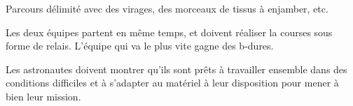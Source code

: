 \documentclass{grand-jeu}
\begin{document}
\begin{liste-materiel}
\end{liste-materiel}

\begin{regles}
Parcours délimité avec des virages, des morceaux de tissus à enjamber, etc.

Les deux équipes partent en même temps, et doivent réaliser la courses sous forme de relais. 
L’équipe qui va le plus vite gagne des b-dures.
\end{regles}

\begin{imaginaire}
Les astronautes doivent montrer qu'ils sont prêts à travailler ensemble dans des conditions difficiles et à s'adapter au matériel à leur disposition pour mener à bien leur mission. 
\end{imaginaire}

\begin{moments-stop}
\end{moments-stop}
\end{document}
